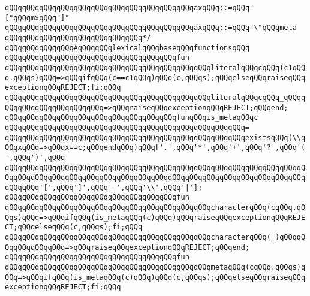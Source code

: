 \verb|qQQqqQQqqQQqqQQqqQQqqQQqqQQqqQQqqQQqqQQqqQQqaxqQQq::=qQQq"["qQQqmxqQQq"]"|\newline
\verb|qQQqqQQqqQQqqQQqqQQqqQQqqQQqqQQqqQQqqQQqqQQqaxqQQq::=qQQq"\"qQQqmeta|\newline
\verb|qQQqqQQqqQQqqQQqqQQqqQQqqQQqqQQq*/|\newline
\newline
\verb|qQQqqQQqqQQqqQQq#qQQqqQQqlexicalqQQqbaseqQQqfunctionsqQQq|\newline
\verb|qQQqqQQqqQQqqQQqqQQqqQQqqQQqqQQqqQQqqQQqfun|\newline
\verb|qQQqqQQqqQQqqQQqqQQqqQQqqQQqqQQqqQQqqQQqqQQqqQQqliteralqQQqcqQQq(c1qQQq.qQQqs)qQQq=>qQQqifqQQq(c==c1qQQq)qQQq(c,qQQqs);qQQqelseqQQqraiseqQQqexceptionqQQqREJECT;fi;qQQq|\newline
\verb|qQQqqQQqqQQqqQQqqQQqqQQqqQQqqQQqqQQqqQQqqQQqqQQqliteralqQQqcqQQq_qQQqqQQqqQQqqQQqqQQqqQQqqQQq=>qQQqraiseqQQqexceptionqQQqREJECT;qQQqend;|\newline
\newline
\verb|qQQqqQQqqQQqqQQqqQQqqQQqqQQqqQQqqQQqqQQqfunqQQqis_metaqQQqc|\newline
\verb|qQQqqQQqqQQqqQQqqQQqqQQqqQQqqQQqqQQqqQQqqQQqqQQqqQQqqQQq=|\newline
\verb|qQQqqQQqqQQqqQQqqQQqqQQqqQQqqQQqqQQqqQQqqQQqqQQqqQQqqQQqexistsqQQq(\\qQQqxqQQq=>qQQqx==c;qQQqendqQQq)qQQq['.',qQQq'*',qQQq'+',qQQq'?',qQQq'(',qQQq')',qQQq|\newline
\verb|qQQqqQQqqQQqqQQqqQQqqQQqqQQqqQQqqQQqqQQqqQQqqQQqqQQqqQQqqQQqqQQqqQQqqQQqqQQqqQQqqQQqqQQqqQQqqQQqqQQqqQQqqQQqqQQqqQQqqQQqqQQqqQQqqQQqqQQqqQQqqQQqqQQq'[',qQQq']',qQQq'-',qQQq'\\',qQQq'|\verb#|'];#\newline
\newline
\verb|qQQqqQQqqQQqqQQqqQQqqQQqqQQqqQQqqQQqqQQqfun|\newline
\verb|qQQqqQQqqQQqqQQqqQQqqQQqqQQqqQQqqQQqqQQqqQQqqQQqcharacterqQQq(cqQQq.qQQqs)qQQq=>qQQqifqQQq(is_metaqQQq(c)qQQq)qQQqraiseqQQqexceptionqQQqREJECT;qQQqelseqQQq(c,qQQqs);fi;qQQq|\newline
\verb|qQQqqQQqqQQqqQQqqQQqqQQqqQQqqQQqqQQqqQQqqQQqqQQqcharacterqQQq(_)qQQqqQQqqQQqqQQqqQQq=>qQQqraiseqQQqexceptionqQQqREJECT;qQQqend;|\newline
\newline
\verb|qQQqqQQqqQQqqQQqqQQqqQQqqQQqqQQqqQQqqQQqfun|\newline
\verb|qQQqqQQqqQQqqQQqqQQqqQQqqQQqqQQqqQQqqQQqqQQqqQQqmetaqQQq(cqQQq.qQQqs)qQQq=>qQQqifqQQq(is_metaqQQq(c)qQQq)qQQq(c,qQQqs);qQQqelseqQQqraiseqQQqexceptionqQQqREJECT;fi;qQQq|\newline
